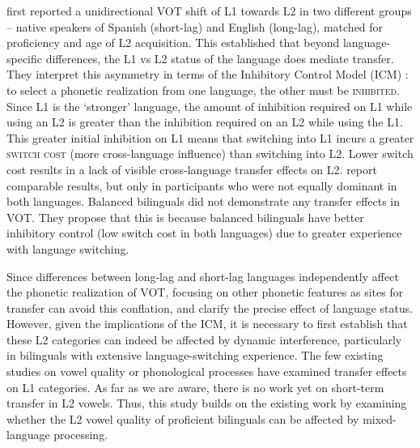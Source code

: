 \documentclass[12 pt]{article}
\begin{document}
\cite{olson2013bilingual} first reported a unidirectional VOT shift of L1 towards L2 in two different groups -- native speakers of Spanish (short-lag) and English (long-lag), matched for proficiency and age of L2 acquisition. This established that beyond language-specific differences, the L1 vs L2 status of the language does mediate transfer. They interpret this asymmetry in terms of the Inhibitory Control Model (ICM) \citep{green1998mental}: to select a phonetic realization from one language, the other must be \textsc{inhibited}. Since L1 is the `stronger' language, the amount of inhibition required on L1 while using an L2 is greater than the inhibition required on an L2 while using the L1. This greater initial inhibition on L1 means that switching into L1 incurs a greater \textsc{switch cost} (more cross-language influence) than switching into L2. Lower switch cost results in a lack of visible cross-language transfer effects on L2. \cite{tsui2019impact} report comparable results, but only in participants who were not equally dominant in both languages. Balanced bilinguals did not demonstrate any transfer effects in VOT. They propose that this is because balanced bilinguals have better inhibitory control (low switch cost in both languages) due to greater experience with language switching.

Since differences between long-lag and short-lag languages independently affect the phonetic realization of VOT, focusing on other phonetic features as sites for transfer can avoid this conflation, and clarify the precise effect of language status. However, given the implications of the ICM, it is necessary to first establish that these L2 categories can indeed be affected by dynamic interference, particularly in bilinguals with extensive language-switching experience. The few existing studies on vowel quality \citep{simonet2014phonetic,muldner2019phonetics,elias2017effects} or phonological processes \citep{simonet2020increased,schwartz2015language} have examined transfer effects on L1 categories. As far as we are aware, there is no work yet on short-term transfer in L2 vowels. Thus, this study builds on the existing work by examining whether the L2 vowel quality of proficient bilinguals can be affected by mixed-language processing.
\end{document}
